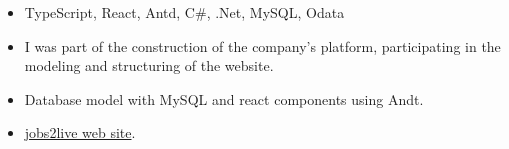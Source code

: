 \documentclass[10pt,a4paper]{altacv}
\begin{document}





\begin{fullwidth}
	\makecvheader
\end{fullwidth}




\begin{itemize}
	\item TypeScript, React, Antd, C\#, .Net, MySQL, Odata
	\item I was part of the construction of the company's platform, participating in the modeling and structuring of the website.
	\item Database model with MySQL and react components using Andt.
	\item \href{https://www.jobs2live.com/website}{jobs2live web site}.
	      
\end{itemize}

\divider
\end{document}
